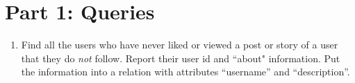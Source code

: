 \documentclass{article}
\newcommand{\var}[1]{\mathit{#1}}
\begin{document}
\section*{Part 1: Queries}

\begin{enumerate}

\item   %
Find all the users who have never liked or viewed a post or story 
of a user that they do {\it not} follow. 
Report their user id and ``about" information. 
Put the information into a relation with attributes ``username'' and ``description''. \\

{\large %

}
\end{enumerate}
\end{document}
